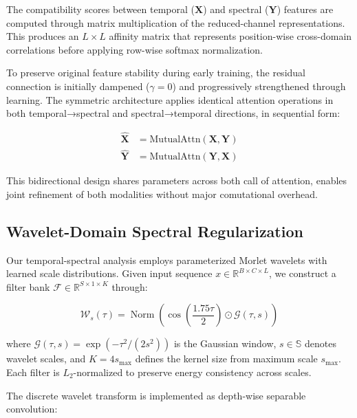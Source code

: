 \documentclass[10pt, conference]{IEEEtran}
\begin{document}
The compatibility scores between temporal ($\mathbf{X}$) and spectral ($\mathbf{Y}$) features are computed through matrix multiplication of the reduced-channel representations. This produces an $L \times L$ affinity matrix that represents position-wise cross-domain correlations before applying row-wise softmax normalization.

To preserve original feature stability during early training, the residual connection is initially dampened ($\gamma=0$) and progressively strengthened through learning. The symmetric architecture applies identical attention operations in both temporal→spectral and spectral→temporal directions, in sequential form:

\begin{equation}
    \begin{aligned}
        \mathbf{\widehat{X}} & = \text{MutualAttn}(\mathbf{X}, \mathbf{Y}) \\
        \mathbf{\widehat{Y}} & = \text{MutualAttn}(\mathbf{Y}, \mathbf{X})
    \end{aligned}
\end{equation}

This bidirectional design shares parameters across both call of attention, enables joint refinement of both modalities without major comutational overhead.

\subsection{Wavelet-Domain Spectral Regularization}
\label{subsec:wavelet}

Our temporal-spectral analysis employs parameterized Morlet wavelets with learned scale distributions. Given input sequence $x \in \mathbb{R}^{B \times C \times L}$, we construct a filter bank $\mathcal{F} \in \mathbb{R}^{S \times 1 \times K}$ through:

\begin{equation}
    \mathcal{W}_s(\tau) = \operatorname{Norm} \left(\cos(\frac{1.75\tau}{2}) \odot \mathcal{G}(\tau,s)\right)
\end{equation}

where $\mathcal{G}(\tau,s) = \exp(-\tau^2/(2s^2))$ is the Gaussian window, $s \in \mathbb{S}$ denotes wavelet scales, and $K=4s_{\text{max}}$ defines the kernel size from maximum scale $s_{\text{max}}$. Each filter is $L_2$-normalized to preserve energy consistency across scales.

The discrete wavelet transform is implemented as depth-wise separable convolution:
\end{document}
